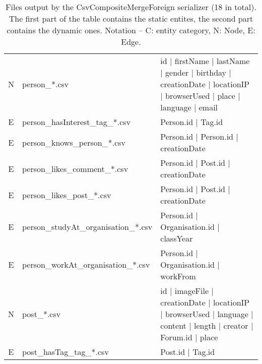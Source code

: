 \begin{table}[htb]
{\begin{tabular}{|c|p{4.3cm}|p{12.4cm}|}
        N                       & person\_*.csv                        & id | firstName | lastName | gender | birthday | creationDate | locationIP | browserUsed | place | language | email  \\
        E                       & person\_hasInterest\_tag\_*.csv      & Person.id | Tag.id                                                                                                  \\
        E                       & person\_knows\_person\_*.csv         & Person.id | Person.id | creationDate                                                                                \\
        E                       & person\_likes\_comment\_*.csv        & Person.id | Post.id | creationDate                                                                                  \\
        E                       & person\_likes\_post\_*.csv           & Person.id | Post.id | creationDate                                                                                  \\
        E                       & person\_studyAt\_organisation\_*.csv & Person.id | Organisation.id | classYear                                                                             \\
        E                       & person\_workAt\_organisation\_*.csv  & Person.id | Organisation.id | workFrom                                                                              \\
        \hline
        N                       & post\_*.csv                          & id | imageFile | creationDate | locationIP | browserUsed | language | content | length | creator | Forum.id | place \\
        E                       & post\_hasTag\_tag\_*.csv             & Post.id | Tag.id                                                                                                    \\
        \hline
    \end{tabular}}
    \caption{Files output by the CsvCompositeMergeForeign serializer (18 in total). The first part of the table contains the static entites, the second part contains the dynamic ones. Notation -- C: entity category, N: Node, E: Edge.}
    \label{table:csv_composite_merge_foreign}
\end{table}
